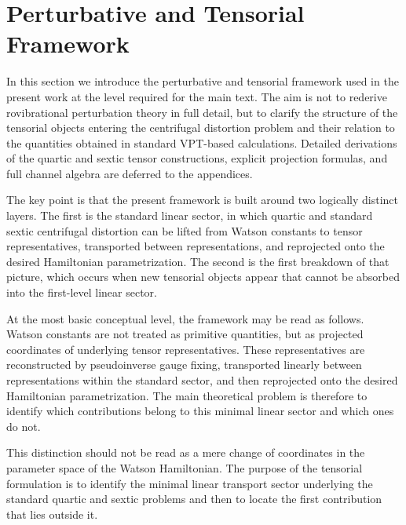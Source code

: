 \section{Perturbative and Tensorial Framework}

In this section we introduce the perturbative and tensorial framework
used in the present work at the level required for the main text.
The aim is not to rederive rovibrational perturbation theory in full
detail, but to clarify the structure of the tensorial objects entering
the centrifugal distortion problem and their relation to the
quantities obtained in standard VPT-based calculations. Detailed
derivations of the quartic and sextic tensor constructions, explicit
projection formulas, and full channel algebra are deferred to the
appendices.

The key point is that the present framework is built around two
logically distinct layers. The first is the standard linear sector, in
which quartic and standard sextic centrifugal distortion can be lifted
from Watson constants to tensor representatives, transported between
representations, and reprojected onto the desired Hamiltonian
parametrization. The second is the first breakdown of that picture,
which occurs when new tensorial objects appear that cannot be absorbed
into the first-level linear sector.

At the most basic conceptual level, the framework may be read as
follows. Watson constants are not treated as primitive quantities, but
as projected coordinates of underlying tensor representatives. These
representatives are reconstructed by pseudoinverse gauge fixing,
transported linearly between representations within the standard
sector, and then reprojected onto the desired Hamiltonian
parametrization. The main theoretical problem is therefore to identify
which contributions belong to this minimal linear sector and which ones
do not.

This distinction should not be read as a mere change of coordinates in
the parameter space of the Watson Hamiltonian. The purpose of the
tensorial formulation is to identify the minimal linear transport
sector underlying the standard quartic and sextic problems and then to
locate the first contribution that lies outside it.

